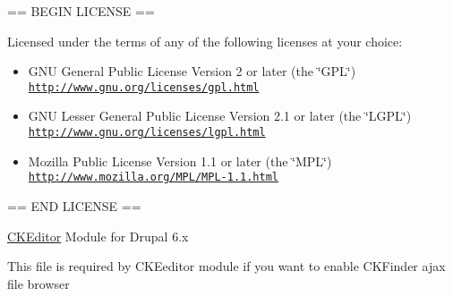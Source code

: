 == BEGIN LICENSE ==

Licensed under the terms of any of the following licenses at your choice:

\begin{itemize}
\item GNU General Public License Version 2 or later (the \char`\"{}GPL\char`\"{}) \href{http://www.gnu.org/licenses/gpl.html}{\tt http://www.gnu.org/licenses/gpl.html}\end{itemize}


\begin{itemize}
\item GNU Lesser General Public License Version 2.1 or later (the \char`\"{}LGPL\char`\"{}) \href{http://www.gnu.org/licenses/lgpl.html}{\tt http://www.gnu.org/licenses/lgpl.html}\end{itemize}


\begin{itemize}
\item Mozilla Public License Version 1.1 or later (the \char`\"{}MPL\char`\"{}) \href{http://www.mozilla.org/MPL/MPL-1.1.html}{\tt http://www.mozilla.org/MPL/MPL-1.1.html}\end{itemize}


== END LICENSE ==

\hyperlink{classCKEditor}{CKEditor} Module for Drupal 6.x

This file is required by CKEeditor module if you want to enable CKFinder ajax file browser 